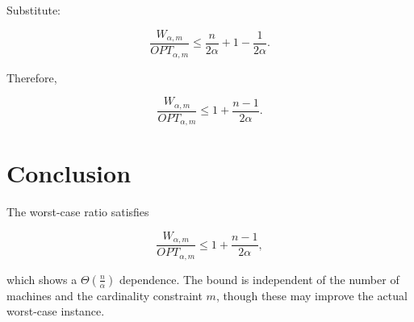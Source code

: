 \documentclass[11pt]{article}
\begin{document}
Substitute:

\[
\frac{W_{\alpha,m}}{OPT_{\alpha,m}}
\le
\frac{n}{2\alpha}
+
1 - \frac{1}{2\alpha}.
\]

Therefore,

\[
\boxed{
\frac{W_{\alpha,m}}{OPT_{\alpha,m}}
\le
1 + \frac{n - 1}{2\alpha}.
}
\]

\section*{Conclusion}

The worst-case ratio satisfies

\[
\frac{W_{\alpha,m}}{OPT_{\alpha,m}} \le 1 + \frac{n - 1}{2\alpha},
\]

which shows a $\Theta\!\left(\frac{n}{\alpha}\right)$ dependence. The bound is independent of the number of machines and the cardinality constraint $m$, though these may improve the actual worst-case instance.
\end{document}

